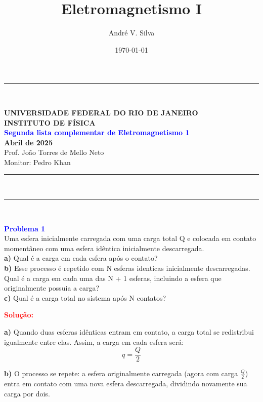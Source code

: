 \documentclass[a4paper,12pt]{article}
\title{ \textbf{\large Eletromagnetismo I }}
\author{Andr\'e V. Silva}
\date{\today}
\begin{document}
\noindent\rule{\linewidth}{0.8pt}\\
\begin{center}
    \textbf{UNIVERSIDADE FEDERAL DO RIO DE JANEIRO}\\
    \textbf{INSTITUTO DE FÍSICA}\\
    \textbf{\textcolor{blue}{Segunda lista complementar de Eletromagnetismo 1}}\\
    \textbf{Abril de 2025}\\
    \vspace{0.5cm}
    Prof. João Torres de Mello Neto\\
    Monitor: Pedro Khan
\end{center}
\noindent\rule{\linewidth}{0.8pt}\\
\maketitle


\noindent\rule{\linewidth}{0.4pt}\\

\justifying

\begin{flushleft}
\textbf{\textcolor{blue}{\Large Problema 1}}\\
Uma esfera inicialmente carregada com uma carga total Q e colocada em
contato moment\^aneo com uma esfera id\^entica inicialmente descarregada. \\
\textbf{a)} Qual \'e a carga em cada esfera ap\'os o contato?\\
\textbf{b)} Esse processo \'e repetido com N esferas identicas inicialmente descarregadas. 
Qual \'e a carga em cada uma das N + 1 esferas, incluindo a esfera que originalmente possuia a carga?\\
\textbf{c)} Qual \'e a carga total no sistema ap\'os N contatos?

\textcolor{red}{\textbf{Solução:}}\\
\end{flushleft}

\textbf{a)} Quando duas esferas idênticas entram em contato, a carga total se redistribui igualmente 
entre elas. Assim, a carga em cada esfera será:
\begin{equation}
q = \frac{Q}{2}
\end{equation}

\textbf{b)} O processo se repete: a esfera originalmente carregada (agora com carga \(\frac{Q}{2}\)) 
entra em contato com uma nova esfera descarregada, dividindo novamente sua carga por dois. 
\end{document}
